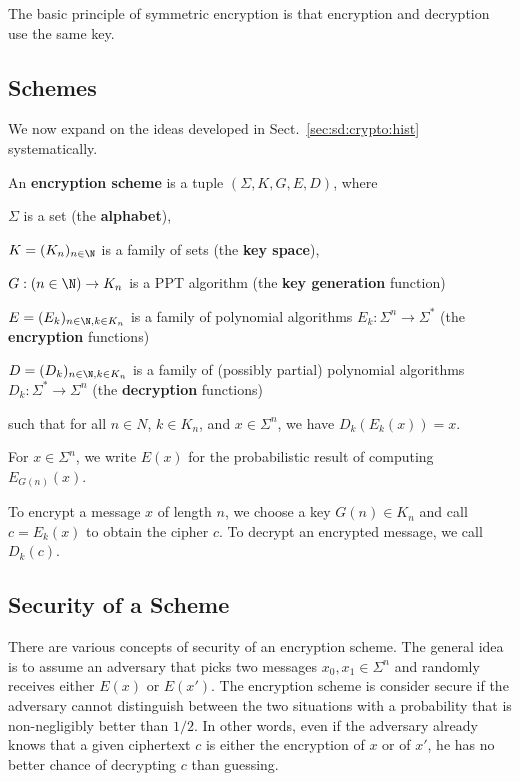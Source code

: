 The basic principle of symmetric encryption is that encryption and decryption use the same key.

\subsection{Schemes}

We now expand on the ideas developed in Sect.~\ref{sec:sd:crypto:hist} systematically.

\begin{definition}
 An \textbf{encryption scheme} is a tuple $(\Sigma,K,G, E, D)$, where
  \begin{compactitem}
   \item $\Sigma$ is a set (the \textbf{alphabet}),
   \item $K=(K_n)_{n\in \N}$ is a family of sets (the \textbf{key space}),
   \item $G:(n\in \N)\to K_n$ is a PPT algorithm (the \textbf{key generation} function)
   \item $E=(E_k)_{n\in\N,k\in K_n}$ is a family of polynomial algorithms $E_k:\Sigma^n\to\Sigma^*$ (the \textbf{encryption} functions)
   \item $D=(D_k)_{n\in\N,k\in K_n}$ is a family of (possibly partial) polynomial algorithms $D_k:\Sigma^*\to\Sigma^n$ (the \textbf{decryption} functions)
  \end{compactitem}
  such that for all $n\in N$, $k\in K_n$, and $x\in \Sigma^n$, we have $D_k(E_k(x))=x$.

  For $x\in\Sigma^n$, we write $E(x)$ for the probabilistic result of computing $E_{G(n)}(x)$.
\end{definition}

To encrypt a message $x$ of length $n$, we choose a key $G(n)\in K_n$ and call $c=E_k(x)$ to obtain the cipher $c$.
To decrypt an encrypted message, we call $D_k(c)$.

\subsection{Security of a Scheme}

There are various concepts of security of an encryption scheme.
The general idea is to assume an adversary that picks two messages $x_0,x_1\in\Sigma^n$ and randomly receives either $E(x)$ or $E(x')$.
The encryption scheme is consider secure if the adversary cannot distinguish between the two situations with a probability that is non-negligibly better than $1/2$.
In other words, even if the adversary already knows that a given ciphertext $c$ is either the encryption of $x$ or of $x'$, he has no better chance of decrypting $c$ than guessing.

